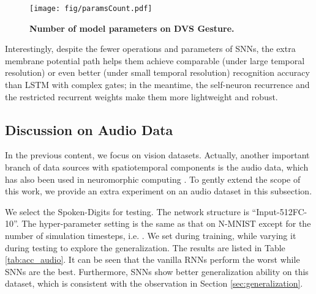 \documentclass[journal,10pt,twocolumn]{IEEETran}
\begin{document}
\begin{figure}[!htbp]
\centering     
\texttt{[image: fig/paramsCount.pdf]}
\caption{\textbf{Number of model parameters on DVS Gesture.}} \label{fig:parameters} 
\end{figure}

Interestingly, despite the fewer operations and parameters of SNNs, the extra membrane potential path helps them achieve comparable (under large temporal resolution) or even better (under small temporal resolution) recognition accuracy than LSTM with complex gates; in the meantime, the self-neuron recurrence and the restricted recurrent weights make them more lightweight and robust.


\subsection{Discussion on Audio Data}

In the previous content, we focus on vision datasets. Actually, another important branch of data sources with spatiotemporal components is the audio data, which has also been used in neuromorphic computing \cite{wu2018spiking, wu2020deep}. To gently extend the scope of this work, we provide an extra experiment on an audio dataset in this subsection. 

\begin{table}[!htbp]
\caption{Accuracy results on audio data.}
\label{tab:acc_audio}
\vspace{2pt}
\centering
\renewcommand\arraystretch{1.3}
\end{table}

We select the Spoken-Digits \cite{Dua:2019} for testing. The network structure is ``Input-512FC-10''. The hyper-parameter setting is the same as that on N-MNIST except for the number of simulation timesteps, i.e. . We set  during training, while varying it during testing to explore the generalization. The results are listed in Table \ref{tab:acc_audio}. It can be seen that the vanilla RNNs perform the worst while SNNs are the best. Furthermore, SNNs show better generalization ability on this dataset, which is consistent with the observation in Section \ref{sec:generalization}.
\end{document}
